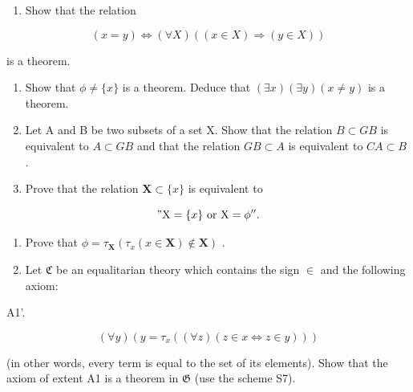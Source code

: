 \exercisegroup

\begin{enumerate}
\def\labelenumi{\arabic{enumi}.}
\tightlist
\item
  Show that the relation
\end{enumerate}

\[
(x = y) \iff (\forall X) ((x \in X) \Longrightarrow (y \in X))
\]

is a theorem.

\begin{enumerate}
\def\labelenumi{\arabic{enumi}.}
\setcounter{enumi}{1}
\item
  Show that \(\phi \neq \{x\}\) is a theorem. Deduce that \((\exists x)(\exists y)(x \neq y)\) is a theorem.
\item
  Let A and B be two subsets of a set X. Show that the relation \(B \subset GB\) is equivalent to \(A \subset GB\) and that the relation \(GB \subset A\) is equivalent to \(CA \subset B\) .
\item
  Prove that the relation \(\mathbf{X} \subset \{x\}\) is equivalent to
\end{enumerate}

\[
" \mathrm{X} = \{x \} \text { or } \mathrm{X} = \phi^ {\prime \prime}.
\]

\begin{enumerate}
\def\labelenumi{\arabic{enumi}.}
\setcounter{enumi}{4}
\item
  Prove that \(\phi = \tau_{\mathbf{X}}(\tau_x(x \in \mathbf{X}) \notin \mathbf{X})\) .
\item
  Let \(\mathfrak{C}\) be an equalitarian theory which contains the sign \(\in\) and the following axiom:
\end{enumerate}

A1'.

\[
(\forall y) (y = \tau_ {x} ((\forall z) (z \in x \Longleftrightarrow z \in y)))
\]

(in other words, every term is equal to the set of its elements). Show that the axiom of extent A1 is a theorem in \(\mathfrak{G}\) (use the scheme S7).

